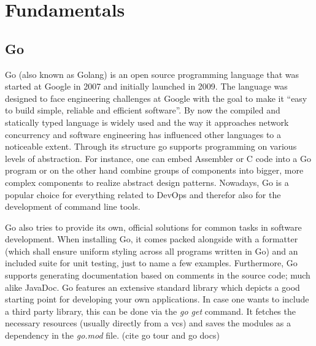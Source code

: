 \chapter{Fundamentals}
\section{Go}
Go (also known as Golang) is an open source programming language that was started at Google in 2007 and initially launched in 2009.
The language was designed to face engineering challenges at Google with the goal to make it \enquote{easy to build simple, reliable and efficient software}. \cite{pike.2020, golang.github}
By now the compiled and statically typed language \cite{chris.2021} is widely used and the way it approaches network concurrency and software engineering has influenced other languages to a noticeable extent. \cite{pike.2020}
Through its structure go supports programming on various levels of abstraction.
For instance, one can embed Assembler or C code into a Go program or on the other hand combine groups of components into bigger, more complex components to realize abstract design patterns. \cite{Maurer2021}
Nowadays, Go is a popular choice for everything related to DevOps and therefor also for the development of command line tools. \cite{mike.2020}

Go also tries to provide its own, official solutions for common tasks in software development.
When installing Go, it comes packed alongside with a formatter (which shall ensure uniform styling across all programs written in Go) and an included suite for unit testing, just to name a few examples.
Furthermore, Go supports generating documentation based on comments in the source code; much alike JavaDoc.
Go features an extensive standard library which depicts a good starting point for developing your own applications.
In case one wants to include a third party library, this can be done via the \emph{go get} command.
It fetches the necessary resources (usually directly from a \ac{vcs}) and saves the modules as a dependency in the \emph{go.mod} file. (cite go tour and go docs)


